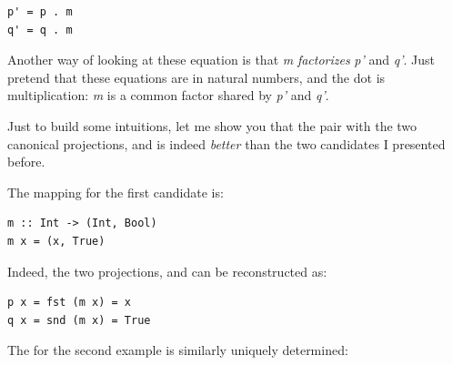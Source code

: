 \begin{Verbatim}[commandchars=\\\{\}]
p' = p . m
q' = q . m
\end{Verbatim}

\begin{figure}[H]
\centering
{}
\end{figure}

\noindent
Another way of looking at these equation is that \emph{m}
\emph{factorizes} \emph{p'} and \emph{q'}. Just pretend that these
equations are in natural numbers, and the dot is multiplication:
\emph{m} is a common factor shared by \emph{p'} and \emph{q'}.

Just to build some intuitions, let me show you that the pair
 with the two canonical projections, 
and  is indeed \emph{better} than the two candidates I
presented before.

\begin{figure}[H]
\centering
{}
\end{figure}

\noindent
The mapping  for the first candidate is:

\begin{Verbatim}[commandchars=\\\{\}]
m :: Int -> (Int, Bool)
m x = (x, True)
\end{Verbatim}
Indeed, the two projections,  and  can be
reconstructed as:

\begin{Verbatim}[commandchars=\\\{\}]
p x = fst (m x) = x
q x = snd (m x) = True
\end{Verbatim}
The  for the second example is similarly uniquely determined:

